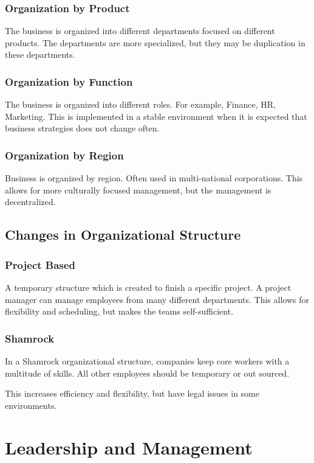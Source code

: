 \documentclass{standalone}
\begin{document}
\subsubsection{Organization by Product}
The business is organized into different departments focused on different products.
The departments are more specialized, but they may be duplication in these departments.

\subsubsection{Organization by Function}
The business is organized into different roles. 
For example, Finance, HR, Marketing.
This is implemented in a stable environment when it is expected that business strategies does not change often.

\subsubsection{Organization by Region}
Business is organized by region.
Often used in multi-national corporations.
This allows for more culturally focused management, but the management is decentralized.

\subsection{Changes in Organizational Structure}
\subsubsection{Project Based}
A temporary structure which is created to finish a specific project.
A project manager can manage employees from many different departments.
This allows for flexibility and scheduling, but makes the teams self-sufficient.

\subsubsection{Shamrock}
In a Shamrock organizational structure, companies keep core workers with a multitude of skills.
All other employees should be temporary or out sourced.

This increases efficiency and flexibility, but have legal issues in some environments.

\section{Leadership and Management} 
\end{document}

